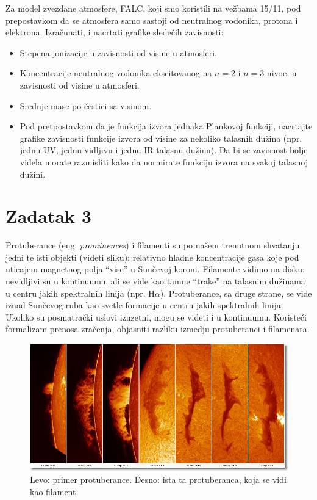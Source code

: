 \documentclass[12pt]{article}
\begin{document}
Za model zvezdane atmosfere, FALC, koji smo koristili na ve\v{z}bama 15/11, pod prepostavkom da se atmosfera samo sastoji od neutralnog vodonika, protona i elektrona. Izra\v{c}unati, i nacrtati grafike sledećih zavisnosti:
\begin{itemize}
    \item Stepena jonizacije u zavisnosti od visine u atmosferi.
    \item Koncentracije neutralnog vodonika ekscitovanog na $n=2$ i $n=3$ nivoe, u zavisnosti od visine u atmosferi. 
    \item Srednje mase po čestici sa visinom. 
    \item Pod pretpostavkom da je funkcija izvora jednaka Plankovoj funkciji, nacrtajte grafike zavisnosti funkcije izvora od visine za nekoliko talasnih du\v{z}ina (npr. jednu UV, jednu vidljivu i jednu IR talasnu du\v{z}inu). Da bi se zavisnost bolje videla morate razmisliti kako da normirate funkciju izvora na svakoj talasnoj du\v{z}ini.
\end{itemize}


\section*{Zadatak 3}

Protuberance (eng: \emph{prominences}) i filamenti su po na\v{s}em trenutnom shvatanju jedni te isti objekti (videti sliku): relativno hladne koncentracije gasa koje pod uticajem magnetnog polja ``vise'' u Sun\v{c}evoj koroni. Filamente vidimo na disku: nevidljivi su u kontinuumu, ali se vide kao tamne ``trake'' na talasnim du\v{z}inama u centru jakih spektralnih linija (npr. H$\alpha$). Protuberance, sa druge strane, se vide iznad Sun\v{c}evog ruba kao svetle formacije u centru jakih spektralnih linija. Ukoliko su posmatra\v{c}ki uslovi izuzetni, mogu se videti i u kontinuumu. Koriste\'{c}i formalizam prenosa zra\v{c}enja, objasniti razliku izmedju protuberanci i filamenata.

\begin{figure}
\includegraphics[width=\textwidth]{promfil.jpg}
\caption{Levo: primer protuberance. Desno: ista ta protuberanca, koja se vidi kao filament.}
\end{figure}
\end{document}
